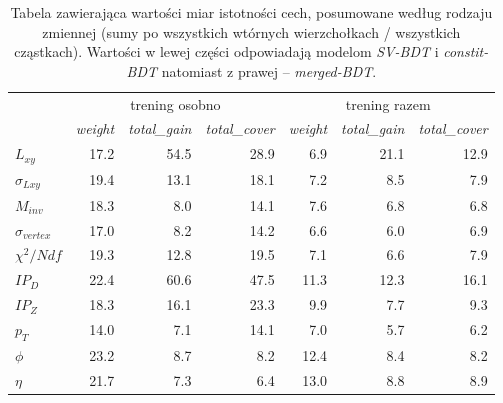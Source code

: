 \begin{table}[ht]
\centering
\begin{tabular}{l|rrr|rrr}
\toprule
{} & \multicolumn{3}{c|}{trening osobno} & \multicolumn{3}{c}{trening razem} \\
{} & \textit{weight} & \textit{total\_gain} & \textit{total\_cover} & \textit{weight} &   \textit{total\_gain} &  \textit{total\_cover} \\
\midrule
$L_{xy}$              &     17.2 &         54.5 &          28.9 &    6.9 &       21.1 &        12.9 \\
$\sigma_{Lxy}$         &     19.4 &         13.1 &          18.1 &    7.2 &        8.5 &         7.9 \\
$M_{inv}$             &     18.3 &          8.0 &          14.1 &    7.6 &        6.8 &         6.8 \\
$\sigma_{vertex}$       &     17.0 &          8.2 &          14.2 &    6.6 &        6.0 &         6.9 \\
$\chi^2/Ndf$             &     19.3 &         12.8 &          19.5 &    7.1 &        6.6 &         7.9 \\
\cmidrule{1-4}
$IP_D$ &     22.4 &         60.6 &          47.5 &   11.3 &       12.3 &        16.1 \\
$IP_Z$ &     18.3 &         16.1 &          23.3 &    9.9 &        7.7 &         9.3 \\
$p_T$               &     14.0 &          7.1 &          14.1 &    7.0 &        5.7 &         6.2 \\
$\phi$              &     23.2 &          8.7 &           8.2 &   12.4 &        8.4 &         8.2 \\
$\eta$              &     21.7 &          7.3 &           6.4 &   13.0 &        8.8 &         8.9 \\
\bottomrule
\end{tabular}
\caption{Tabela zawierająca wartości miar istotności cech, posumowane według rodzaju zmiennej (sumy po wszystkich wtórnych wierzchołkach / wszystkich cząstkach). 
Wartości w lewej części odpowiadają modelom \textit{SV-BDT} i \textit{constit-BDT} natomiast z prawej -- \textit{merged-BDT}.
}
\label{tab:feat_imp_by_name}
\end{table}







